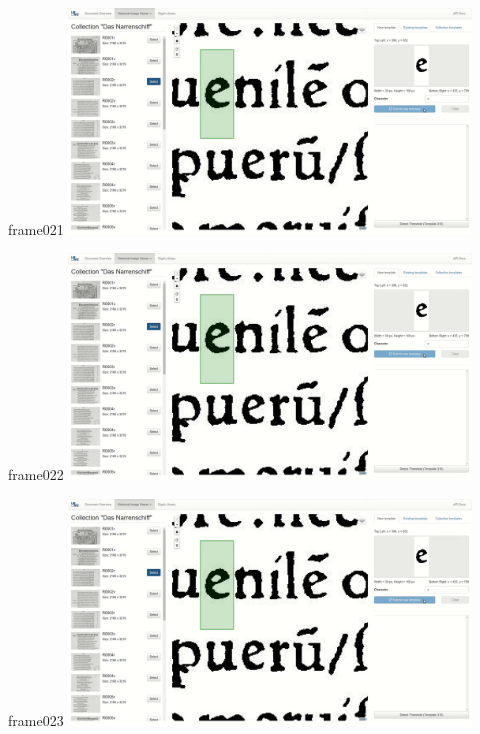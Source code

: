 \documentclass{beamer}
\begin{document}
\begin{frame}{frame021}
\includegraphics[width=0.8\textwidth]{output/exported-frames/frame021.png}
\note{}
\end{frame}

\begin{frame}{frame022}
\includegraphics[width=0.8\textwidth]{output/exported-frames/frame022.png}
\note{}
\end{frame}

\begin{frame}{frame023}
\includegraphics[width=0.8\textwidth]{output/exported-frames/frame023.png}
\note{}
\end{frame}
\end{document}
